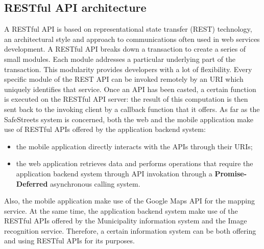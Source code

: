 \subsection{RESTful	API architecture}
A RESTful API is based on representational state transfer (REST) technology, an architectural style and approach to communications often used in web services development.
A RESTful API breaks down a transaction to create a series of small modules. Each module addresses a particular underlying part of the transaction. This modularity provides developers with a lot of flexibility. Every specific module of the REST API can be invoked remotely by an URI which uniquely identifies that service. Once an API has been casted, a certain function is executed on the RESTful API server: the result of this computation is then sent back to the invoking client by a callback function that it offers.
As far as the SafeStreets system is concerned, both the web and the mobile application make use of RESTful APIs offered by the application backend system: 
\begin{itemize}
    \item the mobile application directly interacts with the APIs through their URIs;
    \item the web application retrieves data and performs operations that require the application backend system through API invokation through a \textbf{Promise-Deferred} asynchronous calling system.
\end{itemize}
Also, the mobile application make use of the Google Maps API for the mapping service.\newline
At the same time, the application backend system make use of the RESTful APIs offered by the Municipality information system and the Image recognition service.
Therefore, a certain information system can be both offering and using RESTful APIs for its purposes.

